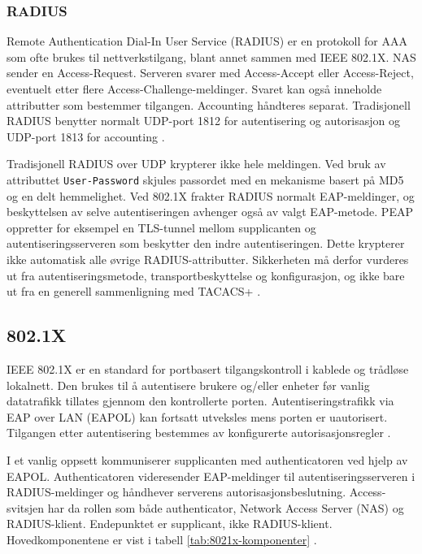 \subsubsection{RADIUS}

Remote Authentication Dial-In User Service (RADIUS) er en protokoll for AAA som ofte brukes til nettverkstilgang, blant annet sammen med IEEE 802.1X. NAS sender en Access-Request. Serveren svarer med Access-Accept eller Access-Reject, eventuelt etter flere Access-Challenge-meldinger. Svaret kan også inneholde attributter som bestemmer tilgangen. Accounting håndteres separat. Tradisjonell RADIUS benytter normalt UDP-port 1812 for autentisering og autorisasjon og UDP-port 1813 for accounting \cite{rfc2865,rfc2866}.

Tradisjonell RADIUS over UDP krypterer ikke hele meldingen. Ved bruk av attributtet \texttt{User-Password} skjules passordet med en mekanisme basert på MD5 og en delt hemmelighet. Ved 802.1X frakter RADIUS normalt EAP-meldinger, og beskyttelsen av selve autentiseringen avhenger også av valgt EAP-metode. PEAP oppretter for eksempel en TLS-tunnel mellom supplicanten og autentiseringsserveren som beskytter den indre autentiseringen. Dette krypterer ikke automatisk alle øvrige RADIUS-attributter. Sikkerheten må derfor vurderes ut fra autentiseringsmetode, transportbeskyttelse og konfigurasjon, og ikke bare ut fra en generell sammenligning med TACACS+ \cite{rfc2865,rfc3579,ms_peap}.

\subsection{802.1X}

IEEE 802.1X er en standard for portbasert tilgangskontroll i kablede og trådløse lokalnett. Den brukes til å autentisere brukere og/eller enheter før vanlig datatrafikk tillates gjennom den kontrollerte porten. Autentiseringstrafikk via EAP over LAN (EAPOL) kan fortsatt utveksles mens porten er uautorisert. Tilgangen etter autentisering bestemmes av konfigurerte autorisasjonsregler \cite{rfc3580,cisco_wired_dot1x}.

I et vanlig oppsett kommuniserer supplicanten med authenticatoren ved hjelp av EAPOL. Authenticatoren videresender EAP-meldinger til autentiseringsserveren i RADIUS-meldinger og håndhever serverens autorisasjonsbeslutning. Access-svitsjen har da rollen som både authenticator, Network Access Server (NAS) og RADIUS-klient. Endepunktet er supplicant, ikke RADIUS-klient. Hovedkomponentene er vist i tabell \ref{tab:8021x-komponenter} \cite{rfc3580,cisco_wired_dot1x}.

